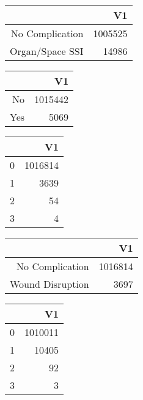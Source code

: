 \bigskip\bigskip
\centering
\begin{tabular}{rr}
  \hline
 & V1 \\ 
  \hline
No Complication & 1005525 \\ 
  Organ/Space SSI & 14986 \\ 
   \hline
\end{tabular}

\bigskip\bigskip
\centering
\begin{tabular}{rr}
  \hline
 & V1 \\ 
  \hline
No & 1015442 \\ 
  Yes & 5069 \\ 
   \hline
\end{tabular}

\bigskip\bigskip
\centering
\begin{tabular}{rr}
  \hline
 & V1 \\ 
  \hline
0 & 1016814 \\ 
  1 & 3639 \\ 
  2 &  54 \\ 
  3 &   4 \\ 
   \hline
\end{tabular}

\bigskip\bigskip
\centering
\begin{tabular}{rr}
  \hline
 & V1 \\ 
  \hline
No Complication & 1016814 \\ 
  Wound Disruption & 3697 \\ 
   \hline
\end{tabular}

\bigskip\bigskip
\centering
\begin{tabular}{rr}
  \hline
 & V1 \\ 
  \hline
0 & 1010011 \\ 
  1 & 10405 \\ 
  2 &  92 \\ 
  3 &   3 \\ 
   \hline
\end{tabular}

